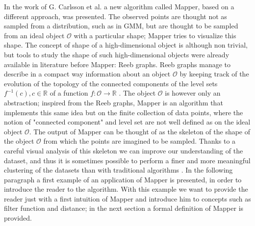 In the work of G. Carlsson et al. \cite{extracting_insights} a new algorithm called Mapper, based on a different approach, was presented. The observed points are thought not as sampled from a distribution, such as in GMM, but are thought to be sampled from an ideal object $\mathcal{O}$ with a particular shape; Mapper tries to visualize this shape. The concept of shape of a high-dimensional object is although non trivial, but tools to study the shape of such high-dimensional objects were already available in literature before Mapper: Reeb graphs. Reeb graphs manage to describe in a compact way information about an object $\mathcal{O}$ by keeping track of the evolution of the topology of the connected components of the level sets $f^{-1}(c), c\in \mathbb{R}$ of a function $f:\mathcal{O}\rightarrow\mathbb{R}$\cite{reebgraphs} \cite{biasotti}. The object $\mathcal{O}$ is however only an abstraction; inspired from the Reeb graphs, Mapper is an algorithm that implements this same idea but on the finite collection of data points, where the notion of "connected component" and level set are not well defined as on the ideal object $\mathcal{O}$. The output of Mapper can be thought of  as the skeleton of the shape of the object $\mathcal{O}$ from which the points are imagined to be sampled.  Thanks to a careful visual analysis of this skeleton we can improve our understanding of the dataset, and thus it is sometimes possible to perform a finer and more meaningful clustering of the datasets than with traditional algorithms \cite{extracting_insights}. In the following paragraph a first example of an application of Mapper is presented, in order to introduce the reader to the algorithm. With this example we want to provide the reader just with a first intuition of Mapper and introduce him to concepts such as filter function and distance; in the next section a formal definition of Mapper is provided.

